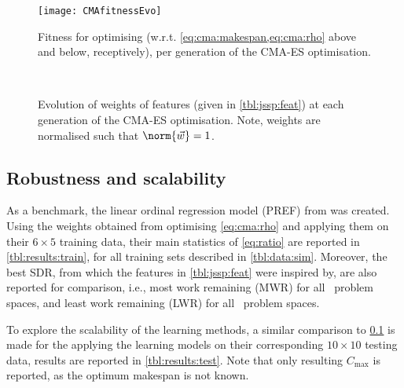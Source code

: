 \begin{figure} 
\texttt{[image: CMAfitnessEvo]}
\caption{Fitness for optimising (w.r.t. \cref{eq:cma:makespan,eq:cma:rho} above and below, receptively), per generation of the CMA-ES optimisation.}\label{fig:cma:fit}
\end{figure}

\begin{figure*} 
\\
\caption{Evolution of weights of features (given in \cref{tbl:jssp:feat}) at each generation of the CMA-ES optimisation. Note, weights are normalised such that $\norm{\vec{w}}=1$.}\label{fig:cma:wei}
\end{figure*}


\subsection{Robustness and  scalability}\label{sec:expr:robust} 
As a benchmark, the linear ordinal regression model (PREF) from \cite{InRu11a} was created.
Using the weights obtained from optimising \cref{eq:cma:rho} and applying them on their  $6\times5$ training data, their main statistics of \cref{eq:ratio} are reported in \cref{tbl:results:train}, for all training sets described in \cref{tbl:data:sim}. Moreover, the best SDR, from which the features in \cref{tbl:jssp:feat} were inspired by, are also reported for comparison, i.e., most work remaining (MWR) for all \JSP\ problem spaces, and least work remaining (LWR) for all \FSP\ problem spaces.

To explore the scalability of the learning methods, a similar comparison to \cref{sec:expr:robust} is made for the applying the learning models on their corresponding $10\times10$ testing data, results are reported in \cref{tbl:results:test}. Note that only resulting $C_{\max}$ is reported, as the optimum makespan is not known. 

